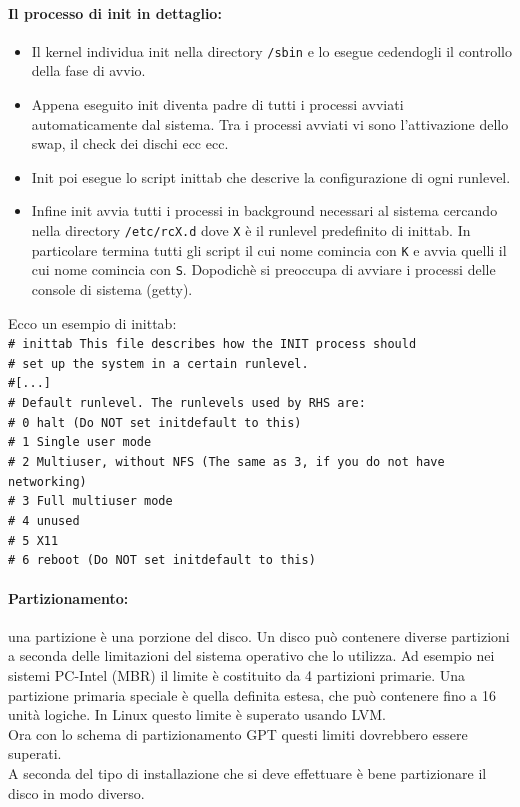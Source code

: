 \documentclass[a4paper]{report}
\newcommand\tab[1][1cm]{\hspace*{#1}}
\begin{document}
\paragraph{Il processo di init in dettaglio:}
\begin{itemize}
\item Il kernel individua init nella directory \texttt{/sbin} e lo esegue cedendogli
il controllo della fase di avvio.
\item Appena eseguito init diventa padre di tutti i processi avviati
automaticamente dal sistema. Tra i processi avviati vi sono
l’attivazione dello swap, il check dei dischi ecc ecc.
\item Init poi esegue lo script inittab che descrive la configurazione di
ogni runlevel.
\item Infine init avvia tutti i processi in background necessari al sistema
cercando nella directory \texttt{/etc/rcX.d} dove \texttt{X} è il runlevel predefinito
di inittab. In particolare termina tutti gli script il cui nome comincia
con \texttt{K} e avvia quelli il cui nome comincia con \texttt{S}. Dopodichè si
preoccupa di avviare i processi delle console di sistema (getty).
\end{itemize}
Ecco un esempio di inittab:
\texttt{\\\tab\# inittab This file describes how the INIT process should
\\\tab\# set up the system in a certain runlevel.
\\\tab\#[...]
\\\tab\# Default runlevel. The runlevels used by RHS are:
\\\tab\# 0 halt
(Do NOT set initdefault to this)
\\\tab\# 1 Single
user mode
\\\tab\# 2 Multiuser,
without NFS (The same as 3, if you do not have
networking)
\\\tab\# 3 Full
multiuser mode
\\\tab\# 4 unused
\\\tab\# 5 X11
\\\tab\# 6 reboot
(Do NOT set initdefault to this)}

\paragraph{Partizionamento:} una partizione è una porzione del disco. Un disco può contenere diverse partizioni a
seconda delle limitazioni del sistema operativo che lo utilizza. Ad esempio nei sistemi
PC-Intel (MBR) il limite è costituito da 4 partizioni primarie. Una partizione primaria
speciale è quella definita estesa, che può contenere fino a 16 unità logiche. In
Linux questo limite è superato usando LVM.\\
Ora con lo schema di partizionamento GPT questi limiti dovrebbero essere
superati.\\
A seconda del tipo di installazione che si deve effettuare è bene partizionare il disco
in modo diverso.\\
\end{document}
